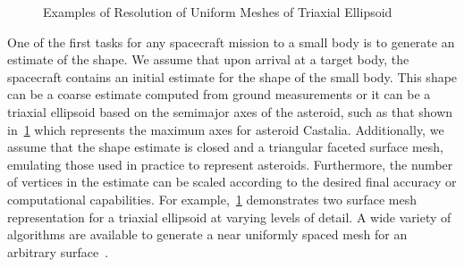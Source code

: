 \documentclass[letterpaper, paper,11pt]{AAS}		%
\begin{document}
\begin{figure}[htbp]
    \centering
    \caption{Examples of Resolution of Uniform Meshes of Triaxial Ellipsoid~\label{fig:uniform_mesh}}
\end{figure}

One of the first tasks for any spacecraft mission to a small body is to generate an estimate of the shape.
We assume that upon arrival at a target body, the spacecraft contains an initial estimate for the shape of the small body.
This shape can be a coarse estimate computed from ground measurements or it can be a triaxial ellipsoid based on the semimajor axes of the asteroid, such as that shown in~\cref{fig:uniform_mesh} which represents the maximum axes for asteroid Castalia.
Additionally, we assume that the shape estimate is closed and a triangular faceted surface mesh, emulating those used in practice to represent asteroids.
Furthermore, the number of vertices in the estimate can be scaled according to the desired final accuracy or computational capabilities.
For example,~\cref{fig:uniform_mesh} demonstrates two surface mesh representation for a triaxial ellipsoid at varying levels of detail. 
A wide variety of algorithms are available to generate a near uniformly spaced mesh for an arbitrary surface~\cite{persson2004,boissonnat2005}.
\end{document}
